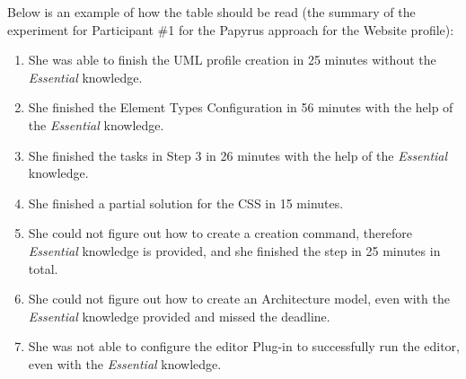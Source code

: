 Below is an example of how the table should be read (the summary of the experiment for Participant \#1 for the Papyrus approach for the Website profile):
\begin{enumerate}
	\item She was able to finish the UML profile creation in 25 minutes without the \textit{Essential} knowledge. 
	\item She finished the Element Types Configuration in 56 minutes with the help of the \textit{Essential} knowledge. 
	
	\item She finished the tasks in Step 3 in 26 minutes with the help of the \textit{Essential} knowledge.
	
	\item She finished a partial solution for the CSS in 15 minutes.
	\item She could not figure out how to create a creation command, therefore \textit{Essential} knowledge is provided, and she finished the step in 25 minutes in total.
	
	\item She could not figure out how to create an Architecture model, even with the \textit{Essential} knowledge provided and missed the deadline.
	\item She was not able to configure the editor Plug-in to successfully run the editor, even with the \textit{Essential} knowledge. 
	
\end{enumerate}

